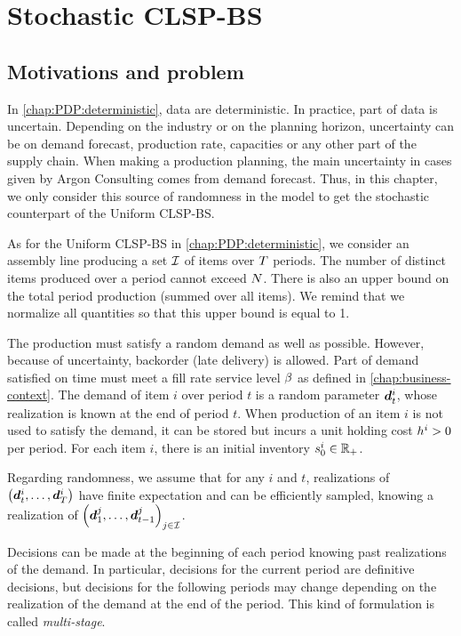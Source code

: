 \chapter{Stochastic CLSP-BS}
\label{chap:PDP:stochastic}


\section{Motivations and problem}


In \cref{chap:PDP:deterministic}, data are deterministic.
In practice, part of data is uncertain.
Depending on the industry or on the planning horizon, uncertainty can be on demand forecast, production rate, capacities or any other part of the supply chain.
When making a production planning, the main uncertainty in cases given by Argon Consulting comes from demand forecast.
Thus, in this chapter, we only consider this source of randomness in the model to get the stochastic counterpart of the Uniform CLSP-BS.


As for the Uniform CLSP-BS in \cref{chap:PDP:deterministic}, we consider an assembly line producing a set $\mathcal{I}$ of items over $T$ periods.
The number of distinct items produced over a period cannot exceed $N$.
There is also an upper bound on the total period production (summed over all items).
We remind that we normalize all quantities so that this upper bound is equal to 1.


The production must satisfy a random demand as well as possible.
However, because of uncertainty, backorder (\ie late delivery) is allowed.
Part of demand satisfied on time must meet a fill rate service level $\beta$ as defined in \cref{chap:business-context}.
The demand of item $i$ over period $t$ is a random parameter $\va\demand_t^i$, whose realization is known at the end of period $t$.
When production of an item $i$ is not used to satisfy the demand, it can be stored but incurs a unit holding cost $h^i>0$ per period.
For each item $i$, there is an initial inventory $s_0^i\in\mathbb{R}_+$.


Regarding randomness, we assume that for any $i$ and $t$, realizations of $\bracket{\va\demand_t^i,\ldots,\va\demand_{\horizon}^i}$ have finite expectation and can be efficiently sampled, knowing a realization of $\bracket{\va\demand_1^j,\ldots,\va\demand_{t-1}^j}_{j\in\REF}$.


Decisions can be made at the beginning of each period knowing past realizations of the demand.
In particular, decisions for the current period are definitive decisions, but decisions for the following periods may change depending on the realization of the demand at the end of the period.
This kind of formulation is called \emph{multi-stage}.


